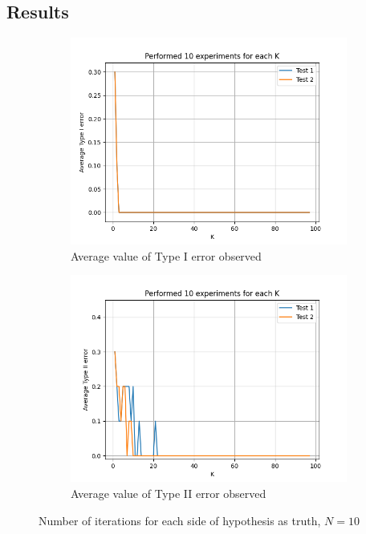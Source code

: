 \documentclass[fleqn, 11pt]{article}
\begin{document}
\subsection{Results}
\begin{figure}[H]
    \centering
    \begin{subfigure}[H]{0.49\textwidth}
        \centering
        \includegraphics[width=\textwidth]{P3/type1_10.png}
        \caption[]{Average value of Type I error observed}
    \end{subfigure}
    \begin{subfigure}[H]{0.49\textwidth}
        \centering
        \includegraphics[width=\textwidth]{P3/type2_10.png}
        \caption[]{Average value of Type II error observed}
    \end{subfigure}
    \caption{Number of iterations for each side of hypothesis as truth, $N = 10$}
\end{figure}
\end{document}

